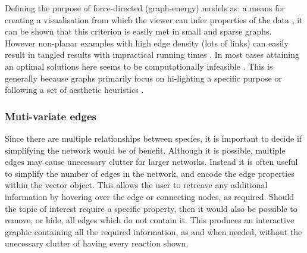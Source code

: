 Defining the purpose of force-directed (graph-energy) models as: a means for creating a visualisation from which the viewer can infer properties of the data \citep{noack}, it can be shown that this criterion is easily met in small and sparse graphs. However non-planar examples with high edge density (lots of links) can easily result in tangled results with impractical running times \citep{tvg}. In most cases attaining an optimal solutions here seems to be computationally infeasible \citep{nicelyanneal}. This is generally because graphs primarily focus on hi-lighting a specific purpose or following a set of aesthetic heuristics \citep{eyetrack}. 

\subsubsection{Muti-variate edges}
Since there are multiple relationships between species, it is important to decide if simplifying the network would be of benefit. Although it is possible, multiple edges may cause unecessary clutter for larger networks. Instead it is often useful to simplify the number of edges in the network, and encode the edge properties within the vector object. This allows the user to retreave any additional information by hovering over the edge or connecting nodes, as required. Should the topic of interest require a specific property, then it would also be possible to remove, or hide, all edges which do not contain it. This produces an interactive graphic containing all the required information, as and when needed, without the unecessary clutter of having every reaction shown. 
% 

% 





